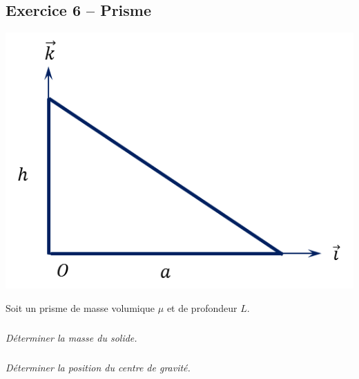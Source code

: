 \documentclass[10pt]{article}
\begin{document}
\subsection*{Exercice 6 -- Prisme}
\setcounter{subparagraph}{0}
\begin{minipage}[c]{.3\linewidth}
\begin{center}
\includegraphics[width=\textwidth]{images/prisme}
\end{center}
\end{minipage} \hfill
\begin{minipage}[c]{.65\linewidth}
Soit un prisme de masse volumique $\mu$ et de profondeur $L$. 
\subparagraph{}
\textit{Déterminer la masse du solide.}
\subparagraph{}
\textit{Déterminer la position du centre de gravité.}
\end{minipage}
\end{document}
